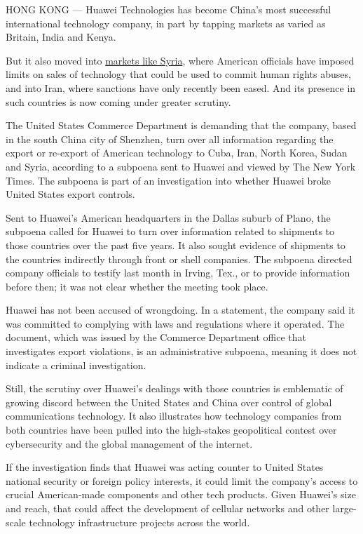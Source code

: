 HONG KONG --- Huawei Technologies has become China's most successful
international technology company, in part by tapping markets as varied
as Britain, India and Kenya.

But it also moved into
\href{https://www.facebook.com/pages/Huawei-Syria-Office/200124263335445}{markets
like Syria}, where American officials have imposed limits on sales of
technology that could be used to commit human rights abuses, and into
Iran, where sanctions have only recently been eased. And its presence in
such countries is now coming under greater scrutiny.

The United States Commerce Department is demanding that the company,
based in the south China city of Shenzhen, turn over all information
regarding the export or re-export of American technology to Cuba, Iran,
North Korea, Sudan and Syria, according to a subpoena sent to Huawei and
viewed by The New York Times. The subpoena is part of an investigation
into whether Huawei broke United States export controls.

Sent to Huawei's American headquarters in the Dallas suburb of Plano,
the subpoena called for Huawei to turn over information related to
shipments to those countries over the past five years. It also sought
evidence of shipments to the countries indirectly through front or shell
companies. The subpoena directed company officials to testify last month
in Irving, Tex., or to provide information before then; it was not clear
whether the meeting took place.

Huawei has not been accused of wrongdoing. In a statement, the company
said it was committed to complying with laws and regulations where it
operated. The document, which was issued by the Commerce Department
office that investigates export violations, is an administrative
subpoena, meaning it does not indicate a criminal investigation.

Still, the scrutiny over Huawei's dealings with those countries is
emblematic of growing discord between the United States and China over
control of global communications technology. It also illustrates how
technology companies from both countries have been pulled into the
high-stakes geopolitical contest over cybersecurity and the global
management of the internet.

If the investigation finds that Huawei was acting counter to United
States national security or foreign policy interests, it could limit the
company's access to crucial American-made components and other tech
products. Given Huawei's size and reach, that could affect the
development of cellular networks and other large-scale technology
infrastructure projects across the world.

